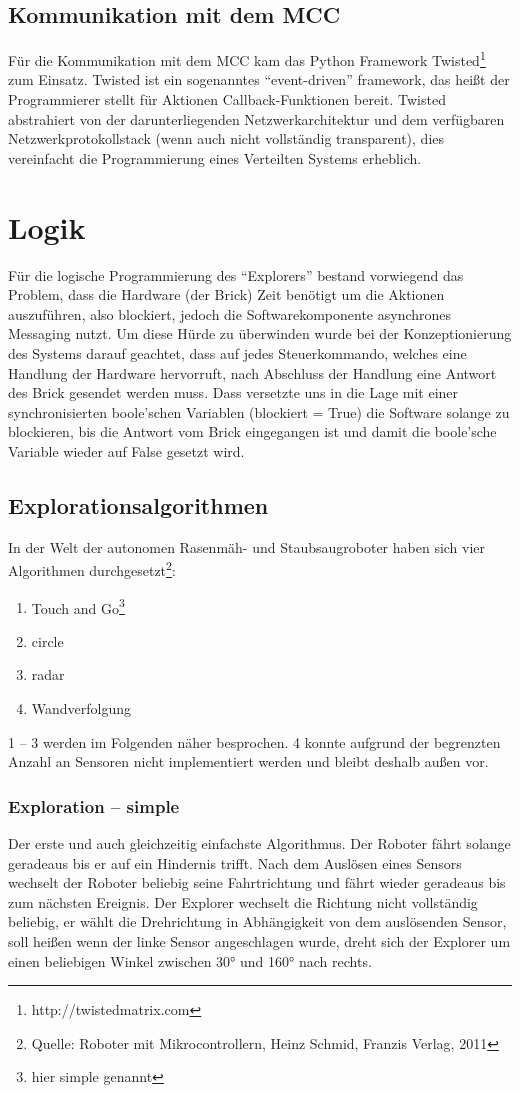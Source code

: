 \documentclass[10pt,a4paper]{scrartcl}
\begin{document}
\subsection{Kommunikation mit dem MCC}
Für die Kommunikation mit dem MCC kam das Python Framework Twisted\footnote{http://twistedmatrix.com} zum Einsatz. Twisted ist ein sogenanntes "`event-driven"' framework, das heißt der Programmierer stellt für Aktionen Callback-Funktionen bereit. Twisted abstrahiert von der darunterliegenden Netzwerkarchitektur und dem verfügbaren Netzwerkprotokollstack (wenn auch nicht vollständig transparent), dies vereinfacht die Programmierung eines Verteilten Systems erheblich.
\section{Logik}
Für die logische Programmierung des "`Explorers"' bestand vorwiegend das Problem, dass die Hardware (der Brick) Zeit benötigt um die Aktionen auszuführen, also blockiert, jedoch die Softwarekomponente asynchrones Messaging nutzt. Um diese Hürde zu überwinden wurde bei der Konzeptionierung des Systems darauf geachtet, dass auf jedes Steuerkommando, welches eine Handlung der Hardware hervorruft, nach Abschluss der Handlung eine Antwort des Brick gesendet werden muss. Dass versetzte uns in die Lage mit einer synchronisierten boole'schen Variablen (blockiert = True) die Software solange zu blockieren, bis die Antwort vom Brick eingegangen ist und damit die boole'sche Variable wieder auf False gesetzt wird.
\subsection{Explorationsalgorithmen}
In der Welt der autonomen Rasenmäh- und Staubsaugroboter haben sich vier Algorithmen durchgesetzt\footnote{Quelle: Roboter mit Mikrocontrollern, Heinz Schmid, Franzis Verlag, 2011}:
\begin{enumerate}
\item Touch and Go\footnote{hier simple genannt} 
\item circle
\item radar
\item Wandverfolgung
\end{enumerate}
1 -- 3 werden im Folgenden näher besprochen. 4 konnte aufgrund der begrenzten Anzahl an Sensoren nicht implementiert werden und bleibt deshalb außen vor. 
\subsubsection{Exploration -- simple}
Der erste und auch gleichzeitig einfachste Algorithmus. Der Roboter fährt solange geradeaus bis er auf ein Hindernis trifft. Nach dem Auslösen eines Sensors wechselt der Roboter beliebig seine Fahrtrichtung und fährt wieder geradeaus bis zum nächsten Ereignis. Der Explorer wechselt die Richtung nicht vollständig beliebig, er wählt die Drehrichtung in Abhängigkeit von dem auslösenden Sensor, soll heißen wenn der linke Sensor angeschlagen wurde, dreht sich der Explorer um einen beliebigen Winkel zwischen 30° und 160° nach rechts.
\end{document}
